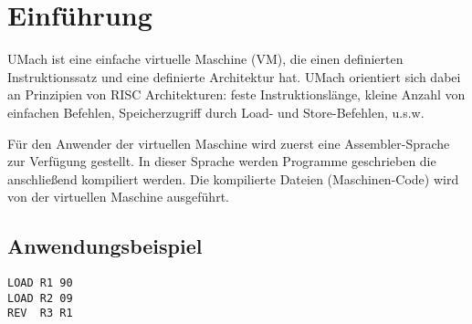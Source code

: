 \chapter{Einführung}
UMach ist eine einfache virtuelle Maschine (VM), die einen definierten Instruktionssatz
und eine definierte Architektur hat. UMach orientiert sich dabei an Prinzipien
von RISC Architekturen: feste Instruktionslänge,
kleine Anzahl von einfachen Befehlen, Speicherzugriff durch Load- und
Store-Befehlen, u.s.w.


Für den Anwender der virtuellen Maschine wird zuerst eine Assembler-Sprache zur
Verfügung gestellt. In dieser Sprache werden Programme geschrieben die
anschließend kompiliert werden. Die kompilierte Dateien (Maschinen-Code) wird
von der virtuellen Maschine ausgeführt.


\section{Anwendungsbeispiel}



\begin{lstlisting}
LOAD R1 90
LOAD R2 09
REV  R3 R1
\end{lstlisting}



